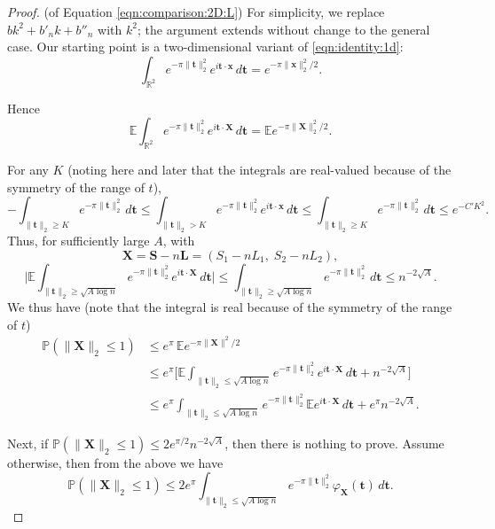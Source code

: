 \documentclass[reqno]{amsart}
\newcommand\R{{\mathbb{R}}}
\renewcommand\P{{\mathbb{P}}}
\newcommand\Bx{{\mathbf x}}
\newcommand\BML{{\bm L}}
\newcommand\BMS{{\bm S}}
\newcommand\BMt{{\bm t}}
\newcommand\BMx{{\bm x}}
\newcommand\BMX{{\bm X}}
\theoremstyle{plain}
\theoremstyle{definition}
\begin{document}
\begin{proof}(of Equation \eqref{eqn:comparison:2D:L})
For simplicity, we replace $b k^{2} + b'_{n} k + b''_{n}$ with $k^{2}$; the argument extends without change to the general case. Our starting point is a two-dimensional variant of \eqref{eqn:identity:1d}:
\begin{equation}\label{eqn:identity:2d}
 \int_{\R^{2}} e^{-\pi\|\BMt\|_{2}^{2}} e^{i \BMt \cdot \BMx} \, d\BMt = e^{-\pi \|\BMx\|_{2}^{2}/2}.
\end{equation}

Hence
\[
\mathbb{E} \int_{\R^{2}} e^{-\pi \|\BMt\|_{2}^{2}} e^{i \BMt \cdot \BMX} \, d\BMt
= \mathbb{E} e^{-\pi \|\BMX\|_{2}^{2}/2}.
\]

For any $K$ (noting here and later that the integrals are real-valued because of the symmetry of the range of $t$),
\[
-\int_{\|\BMt\|_{2}\ge K} e^{-\pi  \|\BMt\|_{2}^{2}}\, d\BMt
 \le \int_{\|\BMt\|_{2}>K} e^{-\pi  \|\BMt\|_{2}^{2}} e^{i \BMt \cdot \Bx} \, d\BMt
 \le \int_{\|\BMt\|_{2} \ge K} e^{-\pi  \|\BMt\|_{2}^{2}} \, d\BMt
 \le e^{-C' K^{2}}.
\]
Thus, for sufficiently large $A$, with
\[
\BMX=\BMS-n\BML = (S_{1}-n L_{1}, \; S_{2} -n L_{2}),
\]
\[
\Big| \mathbb{E} \int_{\|\BMt\|_{2} \ge \sqrt{A\log n}} e^{-\pi  \|\BMt\|_{2}^{2}} e^{i \BMt \cdot \BMX} \, d\BMt \Big|
 \le \int_{\|\BMt\|_{2} \ge \sqrt{A\log n}} e^{-\pi  \|\BMt\|_{2}^{2}} \, d\BMt
 \le n^{-2\sqrt{A}}.
\]
We thus have (note that the integral is real because of the symmetry of the range of $t$)
\begin{align*}
\P(\|\BMX\|_{2}\le 1) &\le e^{\pi} \, \mathbb{E} e^{-\pi \|\BMX\|^{2}/2} \\
&\le e^{\pi} \Big[ \mathbb{E} \int_{\|\BMt\|_{2} \le \sqrt{A\log n}} e^{-\pi  \|\BMt\|_{2}^{2}} e^{i \BMt \cdot \BMX} \, d\BMt + n^{-2\sqrt{A}} \Big] \\
&\le e^{\pi} \int_{\|\BMt\|_{2} \le \sqrt{A\log n}} e^{-\pi  \|\BMt\|_{2}^{2}} \mathbb{E} e^{i \BMt \cdot \BMX} \, d\BMt + e^{\pi} n^{-2\sqrt{A}}.
\end{align*}

Next, if $\P(\|\BMX\|_{2} \le 1)\le 2e^{\pi /2} n^{-2\sqrt{A}}$, then there is nothing to prove. Assume otherwise, then from the above we have
\[
\P(\|\BMX\|_{2}\le 1) \le 2 e^{\pi} \int_{\|\BMt\|_{2} \le \sqrt{A\log n}} e^{-\pi  \|\BMt\|_{2}^{2}} \varphi_{\BMX}(\BMt) \, d\BMt.
\]


\end{proof}
\end{document}
